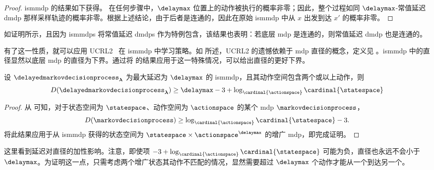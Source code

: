 \begin{proof}
    \gls{ismmdp} 的结果如下获得。
    在任何步骤中，$\delaymax$ 位置上的动作被执行的概率非零；因此，整个过程如同 $\delaymax$-常值延迟 \gls{dmdp} 那样采样轨迹的概率非零。根据上述结论，由于后者是连通的，因此在原始 \gls{ismmdp} 中从 $x$ 出发到达 $x'$ 的概率非零。
\end{proof}

\begin{remark}
    如证明所示，且因为 \glspl{ismmdp} 将常值延迟 \glspl{dmdp} 作为特例包含，该结果也表明：若底层 \gls{mdp} 是连通的，则常值延迟 \gls{dmdp} 也是连通的。
\end{remark}

有了这一性质，就可以应用 UCRL2~\cite{auer2008near} 在 \gls{ismmdp} 中学习策略。如  所述，UCRL2 的遗憾依赖于 \gls{mdp} 直径的概念，定义见 。\gls{ismmdp} 中的直径显然以底层 \gls{mdp} 的直径为下界。通过将 \cite{auer2008near} 的结果应用于这一特殊情况，可以给出直径的更好下界。

\begin{prop}
    设 $\delayedmarkovdecisionprocess_{\boldsymbol\lambda}$ 为最大延迟为 $\delaymax$ 的 \gls{ismmdp}，且其动作空间包含两个或以上动作，则
    \begin{align*}
        D(\delayedmarkovdecisionprocess_{\boldsymbol\lambda})\geq \delaymax-3 + \log_{\cardinal{\actionspace}}\cardinal{\statespace}
    \end{align*}
\end{prop}
\begin{proof}
    从 \cite[Corollary~15]{auer2008near} 可知，对于状态空间为 $\statespace$、动作空间为 $\actionspace$ 的某个 \gls{mdp} $\markovdecisionprocess$，
    \begin{align*}
        D(\markovdecisionprocess)\ge\log_{\cardinal{\actionspace}}\cardinal{\statespace}-3.
    \end{align*}
    将此结果应用于从 \gls{ismmdp} 获得的状态空间为 $\statespace\times\actionspace^{\delaymax}$ 的增广 \gls{mdp}，即完成证明。
\end{proof}

这里看到延迟对直径的加性影响。注意，即使项 $-3 + \log_{\cardinal{\actionspace}}\cardinal{\statespace}$ 可能为负，直径也永远不会小于 $\delaymax$。为证明这一点，只需考虑两个增广状态其动作不匹配的情况，显然需要超过 $\delaymax$ 个动作才能从一个到达另一个。